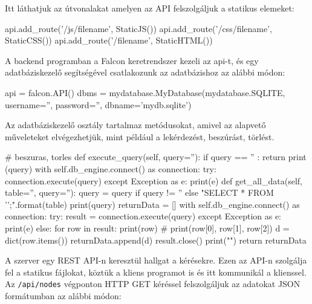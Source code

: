 Itt láthatjuk az útvonalakat amelyen az API felszolgáljuk a statikus elemeket:

\begin{python}
api.add_route('/js/{filename}', StaticJS())
api.add_route('/css/{filename}', StaticCSS())
api.add_route('/{filename}', StaticHTML())
\end{python}

A backend programban a Falcon keretrendszer kezeli az api-t, és egy adatbáziskezelő segítségével csatlakozunk az adatbázishoz az alábbi módon:

\begin{python}
api = falcon.API()
dbms = mydatabase.MyDatabase(mydatabase.SQLITE, username='', password='', 
dbname='mydb.sqlite')
\end{python}

Az adatbáziskezelő osztály tartalmaz metódusokat, amivel az alapvető műveleteket elvégezhetjük, mint például a lekérdezést, beszúrást, törlést.

\begin{python}
# beszuras, torles
    def execute_query(self, query=''):
            if query == '' : return
            print (query)
            with self.db_engine.connect() as connection:
                try:
                    connection.execute(query)
                except Exception as e:
                    print(e)
def get_all_data(self, table='', query=''):
            query = query if query != '' else "SELECT * 
FROM '{}';".format(table)
            print(query)
            returnData = []
            with self.db_engine.connect() as connection:
                try:
                    result = connection.execute(query)
                except Exception as e:
                    print(e)
                else:   
                    for row in result:
                        print(row) # print(row[0], row[1], row[2])
                        d = dict(row.items())
                        returnData.append(d)
                    result.close()
            print("\n")       
            return returnData
\end{python}

A szerver egy REST API-n keresztül hallgat a kérésekre. Ezen az API-n szolgálja fel a statikus fájlokat, köztük a kliens programot is és itt kommunikál a klienssel. Az \texttt{/api/nodes} végponton HTTP GET kéréssel felszolgáljuk az adatokat JSON formátumban az alábbi módon:

\begin{json}
\end{json}

